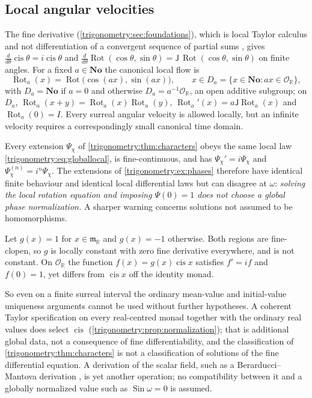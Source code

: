 \documentclass[11pt,letterpaper]{article}
\numberwithin{equation}{section}
\theoremstyle{definition}
\theoremstyle{remark}
\newcommand{\No}{\mathbf{No}}
\newcommand{\R}{\mathbb R}
\newcommand{\OO}{\mathcal O}
\newcommand{\mm}{\mathfrak m}
\newcommand{\cis}{\operatorname{cis}}
\newcommand{\Sin}{\operatorname{Sin}}
\newcommand{\Rot}{\operatorname{Rot}}
\begin{document}
\subsection{Local angular velocities}\label{trigonometry:rot:sec:flows}
The fine derivative (\cref{trigonometry:sec:foundations}), which is local Taylor calculus and not
differentiation of a convergent sequence of partial sums \cite[\S3]{BMgerms}, gives $\frac{d}{d\theta}\cis\theta=i\cis\theta$
and $\frac{d}{d\theta}\Rot(\cos\theta,\sin\theta)=\mathsf J\,\Rot(\cos\theta,\sin\theta)$ on finite
angles. For a fixed $a\in\No$ the canonical local flow is
\begin{equation}\label{trigonometry:rot:eq:localflow}
 \Rot_a(x)=\Rot\bigl(\cos(ax),\sin(ax)\bigr),\qquad x\in D_a=\{x\in\No:ax\in\OO_{\R}\},
\end{equation}
with $D_a=\No$ if $a=0$ and otherwise $D_a=a^{-1}\OO_{\R}$, an open additive subgroup; on $D_a$,
$\Rot_a(x+y)=\Rot_a(x)\Rot_a(y)$, $\Rot_a'(x)=a\mathsf J\Rot_a(x)$ and $\Rot_a(0)=I$. Every surreal
angular velocity is allowed locally, but an infinite velocity requires a correspondingly small
canonical time domain.

Every extension $\Psi_\chi$ of \cref{trigonometry:thm:characters} obeys the same local law
\cref{trigonometry:eq:globallocal}, is fine-continuous, and has $\Psi_\chi'=i\Psi_\chi$ and
$\Psi_\chi^{(n)}=i^n\Psi_\chi$. The extensions of \cref{trigonometry:ex:phases} therefore have
identical finite behaviour and identical local differential laws but can disagree at $\omega$:
\emph{solving the local rotation equation and imposing $\Psi(0)=1$ does not choose a global phase
normalization.} A sharper warning concerns solutions not assumed to be homomorphisms.

\begin{example}\label{trigonometry:rot:ex:locallyconstant}
Let $g(x)=1$ for $x\in\mm_{\R}$ and $g(x)=-1$ otherwise. Both regions are fine-clopen, so $g$ is
locally constant with zero fine derivative everywhere, and is not constant. On $\OO_{\R}$ the function
$f(x)=g(x)\cis x$ satisfies $f'=if$ and $f(0)=1$, yet differs from $\cis x$ off the identity monad.
\end{example}
So even on a finite surreal interval the ordinary mean-value and initial-value uniqueness arguments
cannot be used without further hypotheses. A coherent Taylor specification on every real-centred
monad together with the ordinary real values does select $\cis$ (\cref{trigonometry:prop:normalization});
that is additional global data, not a consequence of fine differentiability, and the classification
of \cref{trigonometry:thm:characters} is not a classification of solutions of the fine differential
equation. A derivation of the scalar field, such as a Berarducci--Mantova derivation \cite{BM}, is yet
another operation; no compatibility between it and a globally normalized value such as
$\Sin\omega=0$ is assumed.
\end{document}
